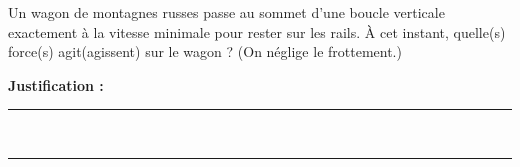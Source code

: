 Un wagon de montagnes russes passe au sommet d'une boucle verticale exactement à la vitesse minimale pour rester sur les rails. À cet instant, quelle(s) force(s) agit(agissent) sur le wagon ? (On néglige le frottement.)

\choices

\noindent\textbf{Justification :} \hrulefill \\[2.5ex]
\rule{\linewidth}{0.4pt} \\[2.5ex]
\rule{\linewidth}{0.4pt}
\vfill
